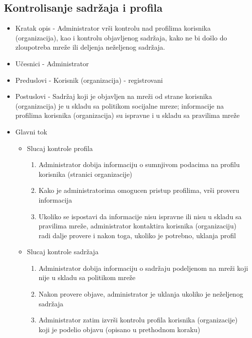 \subsection{Kontrolisanje sadržaja i profila}
\begin{itemize}
\item Kratak opis - Administrator vrši kontrolu nad profilima korisnika (organizacija), kao i kontrolu objavljenog sadržaja, kako ne bi došlo do zloupotreba mreže ili deljenja neželjenog sadržaja. 
\item Učesnici - Administrator
\item Preduslovi - Korisnik (organizacija) - registrovani
\item Postuslovi - Sadržaj koji je objavljen na mreži od strane korisnika (organizacija) je u skladu sa politikom socijalne mreze;
informacije na profilima korisnika (organizacija) su ispravne i u skladu sa pravilima mreže
\item Glavni tok
	\begin{itemize}
	\item Slucaj kontrole profila
	\begin{enumerate}
	\item Administrator dobija informaciju o sumnjivom podacima na profilu korisnika (stranici organizacije)
	\item Kako je administratorima omogucen pristup profilima, vrši proveru informacija
	\item Ukoliko se ispostavi da informacije nisu ispravne ili nisu u skladu sa pravilima mreže, administrator kontaktira korisnika (organizaciju) radi dalje provere i nakon toga, ukoliko je potrebno, uklanja profil
	\end{enumerate}
	\end{itemize}
	\begin{itemize}
	\item Slucaj kontrole sadržaja
	\begin{enumerate}
	\item Administrator dobija informaciju o sadržaju podeljenom na mreži koji nije u skladu sa politikom mreže
	\item Nakon provere objave, administrator je uklanja ukoliko je neželjenog sadržaja 
	\item Administrator zatim izvrši kontrolu profila korisnika (organizacije) koji je podelio objavu (opisano u prethodnom koraku)
	\end{enumerate}
	\end{itemize}
\end{itemize}


